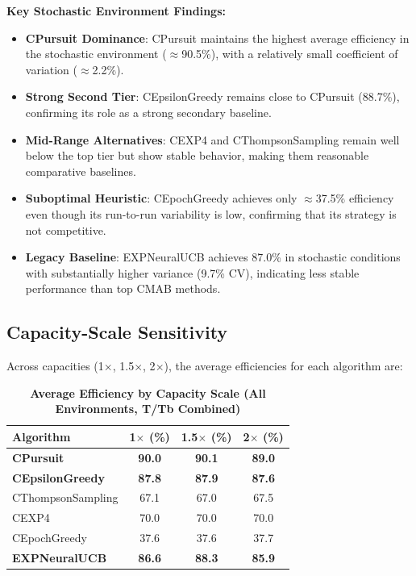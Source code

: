 \documentclass[12pt,a4paper]{article}
\newcommand{\performance}[1]{\textcolor{performancecolor}{\textbf{#1}}}
\newcommand{\stochastic}[1]{\textcolor{stochasticcolor}{\textbf{#1}}}
\newcommand{\critical}[1]{\textcolor{criticalcolor}{\textbf{#1}}}
\newcommand{\legacy}[1]{\textcolor{legacycolor}{\textbf{#1}}}
\begin{document}
\begin{tcolorbox}[colback=stochasticcolor!10,colframe=stochasticcolor,title=\textbf{Stochastic Environment Deep Analysis (1$\times$–2$\times$ Capacities, T/Tb Combined)}]
\textbf{Key Stochastic Environment Findings:}
\begin{itemize}
\item \stochastic{CPursuit Dominance}: CPursuit maintains the highest average efficiency in the stochastic environment ($\approx$90.5\%), with a relatively small coefficient of variation ($\approx$2.2\%).
\item \stochastic{Strong Second Tier}: CEpsilonGreedy remains close to CPursuit (88.7\%), confirming its role as a strong secondary baseline.
\item \stochastic{Mid-Range Alternatives}: CEXP4 and CThompsonSampling remain well below the top tier but show stable behavior, making them reasonable comparative baselines.
\item \critical{Suboptimal Heuristic}: CEpochGreedy achieves only $\approx$37.5\% efficiency even though its run-to-run variability is low, confirming that its strategy is not competitive.
\item \legacy{Legacy Baseline}: EXPNeuralUCB achieves 87.0\% in stochastic conditions with substantially higher variance (9.7\% CV), indicating less stable performance than top CMAB methods.
\end{itemize}

\end{tcolorbox}

\subsection{Capacity-Scale Sensitivity}

Across capacities (1$\times$, 1.5$\times$, 2$\times$), the average efficiencies for each algorithm are:

\begin{table}[H]
\centering
\caption{\performance{Average Efficiency by Capacity Scale (All Environments, T/Tb Combined)}}
\begin{tabular}{|l|c|c|c|}
\hline
\textbf{Algorithm} & \textbf{1$\times$ (\%)} & \textbf{1.5$\times$ (\%)} & \textbf{2$\times$ (\%)} \\
\hline
\hline
\performance{CPursuit}        & \performance{90.0} & \performance{90.1} & \performance{89.0} \\
\performance{CEpsilonGreedy} & \performance{87.8} & \performance{87.9} & \performance{87.6} \\
CThompsonSampling            & 67.1              & 67.0              & 67.5 \\
CEXP4                        & 70.0              & 70.0              & 70.0 \\
CEpochGreedy                 & 37.6              & 37.6              & 37.7 \\
\legacy{EXPNeuralUCB}        & \legacy{86.6}     & \legacy{88.3}     & \legacy{85.9} \\
\hline
\end{tabular}
\end{table}
\end{document}
